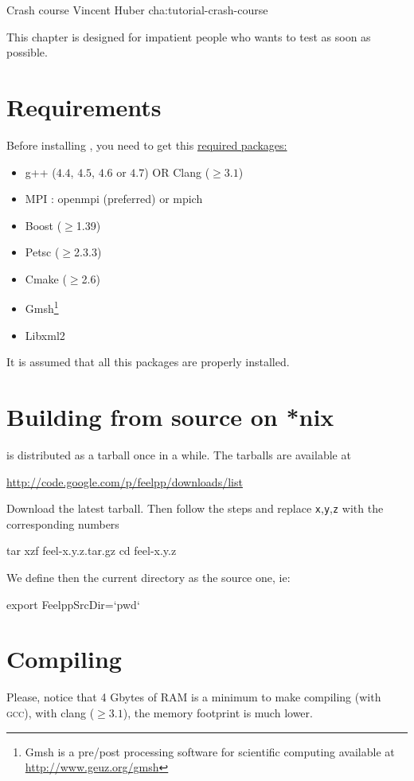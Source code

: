             {Crash course}
            {Vincent Huber}
            {cha:tutorial-crash-course}

This chapter is designed for impatient people who wants to test \feel as soon as possible.
\section{Requirements}
Before installing \feel, you need to get this \underline{required packages:}\\
\begin{itemize}
\item g++ ($4.4$, $4.5$, $4.6$ or $4.7$) OR Clang ($\geq 3.1$)
\item MPI : openmpi (preferred) or mpich
\item Boost ($\geq$1.39)
\item Petsc ($\geq$2.3.3)
\item Cmake ($\geq$2.6)
\item Gmsh\footnote{Gmsh is a pre/post processing software for scientific
computing available at \url{http://www.geuz.org/gmsh}}
\item Libxml2
\end{itemize}
It is assumed that all this packages are properly installed.

\section{Building \feel from source on *nix}
\feel is distributed as a tarball once in a while. The tarballs are available
at
\begin{center}
  \href{http://code.google.com/p/feelpp/downloads/list}{http://code.google.com/p/feelpp/downloads/list}
\end{center}
Download the latest tarball. Then follow the steps and replace
\texttt{x},\texttt{y},\texttt{z} with the corresponding numbers

\begin{unixcom}
  tar xzf feel-x.y.z.tar.gz
  cd feel-x.y.z
\end{unixcom}
We define then the current directory as the source one, ie:
\begin{unixcom}
  export FeelppSrcDir=`pwd`
\end{unixcom}

\section{Compiling}
Please, notice that 4 Gbytes of RAM is a minimum to make \feel compiling (with \textsc{gcc}), with clang ($\geq 3.1$), the memory footprint is much lower.

